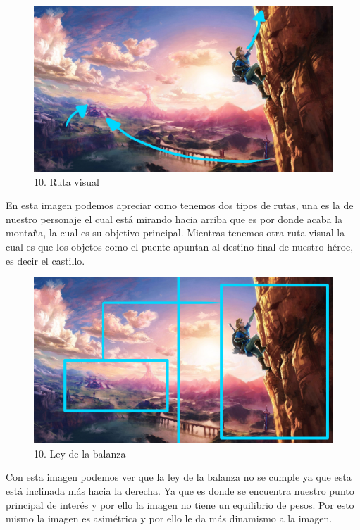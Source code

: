 \documentclass[12pt]{article}
\begin{document}
        \begin{figure}[H]
          \centering
          \includegraphics[scale=0.35]{images/Selena/10 flechas.jpg}
          \caption{\small 10. Ruta visual}
        \end{figure}
        En esta imagen podemos apreciar como tenemos dos tipos de rutas, una es la de nuestro personaje el cual está mirando hacia arriba que es por donde acaba la montaña, la cual es su objetivo principal. Mientras tenemos otra ruta visual la cual es que los objetos como el puente apuntan al destino final de nuestro héroe, es decir el castillo.
        \begin{figure}[H]
          \centering
          \includegraphics[scale=0.35]{images/Selena/10 balanza.jpg}
          \caption{\small 10. Ley de la balanza}
        \end{figure}
        Con esta imagen podemos ver que la ley de la balanza no se cumple ya que esta está inclinada más hacia la derecha. Ya que es donde se encuentra nuestro punto principal de interés y por ello la imagen no tiene un equilibrio de pesos. Por esto mismo la imagen es asimétrica y por ello le da más dinamismo a la imagen.  
\end{document}
